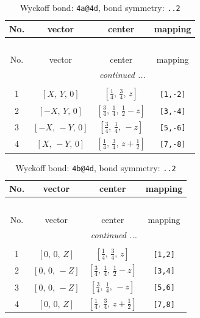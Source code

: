 \documentclass[fleqn,8pt]{jsarticle}
\begin{document}
\begin{longtable}{cccc}
\caption{Wyckoff bond: {\tt 4a@4d}, bond symmetry: {\tt ..2}}
 \\
 \hline \hline
No. & vector & center & mapping \\ \hline \endfirsthead

\multicolumn{3}{l}{\tablename\ \thetable{}} \\
 \hline \hline
No. & vector & center & mapping \\ \hline \endhead

 \hline \hline
\multicolumn{3}{r}{\footnotesize\it continued ...} \\ \endfoot

 \hline \hline
\multicolumn{3}{r}{} \\ \endlastfoot

1 & $\left[ X,\, Y,\, 0 \right]$ & $\left[ \frac{1}{4},\, \frac{3}{4},\, z \right]$ & {\tt [1,-2]} \\ \hline
2 & $\left[ - X,\, Y,\, 0 \right]$ & $\left[ \frac{3}{4},\, \frac{1}{4},\, \frac{1}{2} - z \right]$ & {\tt [3,-4]} \\ \hline
3 & $\left[ - X,\, - Y,\, 0 \right]$ & $\left[ \frac{3}{4},\, \frac{1}{4},\, - z \right]$ & {\tt [5,-6]} \\ \hline
4 & $\left[ X,\, - Y,\, 0 \right]$ & $\left[ \frac{1}{4},\, \frac{3}{4},\, z + \frac{1}{2} \right]$ & {\tt [7,-8]} \\
\end{longtable}
\renewcommand{\arraystretch}{1.2}
\begin{longtable}{cccc}
\caption{Wyckoff bond: {\tt 4b@4d}, bond symmetry: {\tt ..2}}
 \\
 \hline \hline
No. & vector & center & mapping \\ \hline \endfirsthead

\multicolumn{3}{l}{\tablename\ \thetable{}} \\
 \hline \hline
No. & vector & center & mapping \\ \hline \endhead

 \hline \hline
\multicolumn{3}{r}{\footnotesize\it continued ...} \\ \endfoot

 \hline \hline
\multicolumn{3}{r}{} \\ \endlastfoot

1 & $\left[ 0,\, 0,\, Z \right]$ & $\left[ \frac{1}{4},\, \frac{3}{4},\, z \right]$ & {\tt [1,2]} \\ \hline
2 & $\left[ 0,\, 0,\, - Z \right]$ & $\left[ \frac{3}{4},\, \frac{1}{4},\, \frac{1}{2} - z \right]$ & {\tt [3,4]} \\ \hline
3 & $\left[ 0,\, 0,\, - Z \right]$ & $\left[ \frac{3}{4},\, \frac{1}{4},\, - z \right]$ & {\tt [5,6]} \\ \hline
4 & $\left[ 0,\, 0,\, Z \right]$ & $\left[ \frac{1}{4},\, \frac{3}{4},\, z + \frac{1}{2} \right]$ & {\tt [7,8]} \\
\end{longtable}
\end{document}

